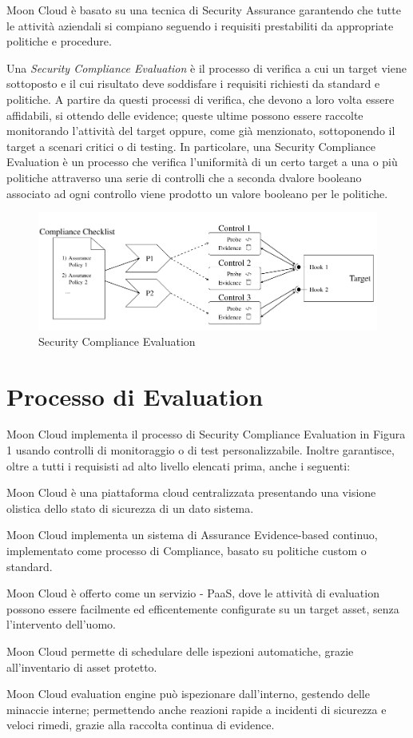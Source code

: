 Moon Cloud è basato su una tecnica di Security Assurance garantendo che tutte le attività aziendali si compiano seguendo i requisiti 
prestabiliti da appropriate politiche e procedure.

Una \textit{Security Compliance Evaluation} è il processo di verifica a cui un target viene sottoposto e il cui risultato deve 
soddisfare i requisiti richiesti da standard e politiche. A partire da questi processi di verifica, che devono a loro volta essere 
affidabili, si ottendo delle evidence; queste ultime possono essere raccolte monitorando l'attività del target oppure, come già 
menzionato, sottoponendo il target a scenari critici o di testing.
In particolare, una Security Compliance Evaluation è un processo che verifica l'uniformità di un certo target a una o più politiche 
attraverso una serie di controlli che a seconda dvalore booleano associato ad ogni controllo viene prodotto un valore booleano 
per le politiche.
\begin{figure}
	\includegraphics[scale=0.5]{images/Security_Compliance_Evaluation.PNG}
	\caption{Security Compliance Evaluation}
\end{figure}

\newpage

\section{Processo di Evaluation}
Moon Cloud implementa il processo di Security Compliance Evaluation in Figura 1 usando controlli di monitoraggio o di test 
personalizzabile. Inoltre garantisce, oltre a tutti i requisisti ad alto livello elencati prima, anche i seguenti:
\begin{description}
	\item Moon Cloud è una piattaforma cloud centralizzata presentando una visione olistica dello stato di sicurezza di un dato sistema.
	\item Moon Cloud implementa un sistema di Assurance Evidence-based continuo, implementato come processo di Compliance,
	basato su politiche custom o standard.
	\item Moon Cloud è offerto come un servizio - PaaS, dove le attività di evaluation possono essere facilmente ed efficentemente 
	configurate su un target asset, senza l'intervento dell'uomo.
	\item Moon Cloud permette di schedulare delle ispezioni automatiche, grazie all'inventario di asset protetto.
	\item Moon Cloud evaluation engine può ispezionare dall'interno, gestendo delle minaccie interne; permettendo anche reazioni rapide
	a incidenti di sicurezza e veloci rimedi, grazie alla raccolta continua di evidence. 
\end{description}


